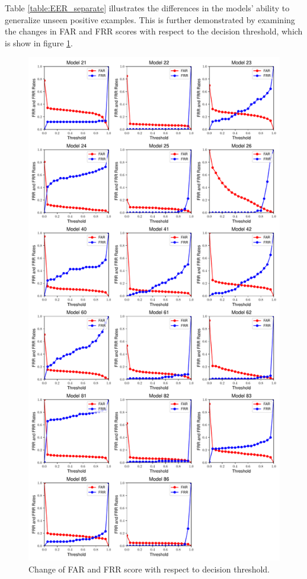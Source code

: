 Table \ref{table:EER_separate} illustrates the differences in the models' ability to generalize unseen positive examples. This is further demonstrated by examining the changes in FAR and FRR scores with respect to the decision threshold, which is show in figure \ref{fig:far_ffr_all_thresholds}. 

\begin{figure}[H]
	\centering
	\includegraphics[width=.8\textwidth]{images/far_frr_curves_all_models_subplots.pdf} %
	\caption{Change of FAR and FRR score with respect to decision threshold.}
	\label{fig:far_ffr_all_thresholds}
\end{figure}

